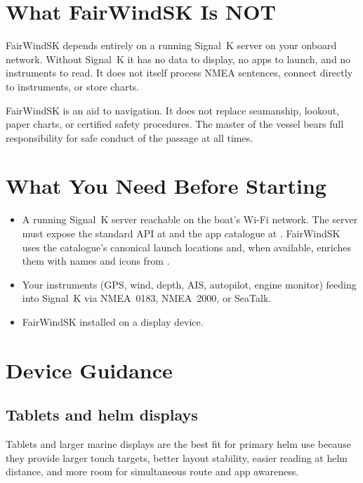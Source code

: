 \section{What FairWindSK Is NOT}

FairWindSK depends entirely on a running Signal~K server on your onboard network.
Without Signal~K it has no data to display, no apps to launch, and no instruments
to read.
It does not itself process NMEA sentences, connect directly to instruments, or store
charts.

\begin{warningbox}
FairWindSK is an aid to navigation.
It does not replace seamanship, lookout, paper charts, or certified safety
procedures.
The master of the vessel bears full responsibility for safe conduct of the passage
at all times.
\end{warningbox}

\section{What You Need Before Starting}

\begin{itemize}
  \item A running Signal~K server reachable on the boat's Wi-Fi network.
        The server must expose the standard API at
         and the app catalogue at
        . FairWindSK uses the catalogue's
        canonical launch locations and, when available, enriches them with names
        and icons from .
  \item Your instruments (GPS, wind, depth, AIS, autopilot, engine monitor) feeding
        into Signal~K via NMEA~0183, NMEA~2000, or SeaTalk.
  \item FairWindSK installed on a display device.
\end{itemize}

\section{Device Guidance}

\subsection{Tablets and helm displays}

Tablets and larger marine displays are the best fit for primary helm use because
they provide larger touch targets, better layout stability, easier reading at helm
distance, and more room for simultaneous route and app awareness.

